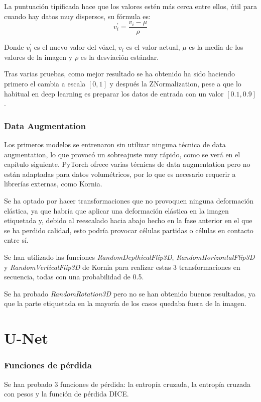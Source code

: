 La puntuación tipificada hace que los valores estén más cerca entre ellos, útil para cuando hay datos muy dispersos, su fórmula es:
\begin{equation}
v_i^{'} = \frac{v_i - \mu}{\rho}
\end{equation}

Donde $v_i^{'}$ es el nuevo valor del vóxel, $v_i$ es el valor actual, $\mu$ es la media de los valores de la imagen y $\rho$ es la desviación estándar.

Tras varias pruebas, como mejor resultado se ha obtenido ha sido haciendo primero el cambia a escala $[0,1]$ y después la ZNormalization, pese a que lo habitual en deep learning es preparar los datos de entrada con un valor $[0.1,0.9]$.

\subsubsection{Data Augmentation}

Los primeros modelos se entrenaron sin utilizar ninguna técnica de data augmentation, lo que provocó un sobreajuste muy rápido, como se verá en el capítulo siguiente. PyTorch ofrece varias técnicas de data augmentation pero no están adaptadas para datos volumétricos, por lo que es necesario requerir a librerías externas, como Kornia.

Se ha optado por hacer transformaciones que no provoquen ninguna deformación elástica, ya que habría que aplicar una deformación elástica en la imagen etiquetada y, debido al reescalado hacia abajo hecho en la fase anterior en el que se ha perdido calidad, esto podría provocar células partidas o células en contacto entre sí.

Se han utilizado las funciones \textit{RandomDepthicalFlip3D}, \textit{RandomHorizontalFlip3D} y \textit{RandomVerticalFlip3D} de Kornia para realizar estas 3 transformaciones en secuencia, todas con una probabilidad de 0.5.

Se ha probado \textit{RandomRotation3D} pero no se han obtenido buenos resultados, ya que la parte etiquetada en la mayoría de los casos quedaba fuera de la imagen.

\section{U-Net}\label{sec:unet_implementation}

\subsubsection{Funciones de pérdida}
Se han probado 3 funciones de pérdida: la entropía cruzada, la entropía cruzada con pesos y la función de pérdida DICE.

